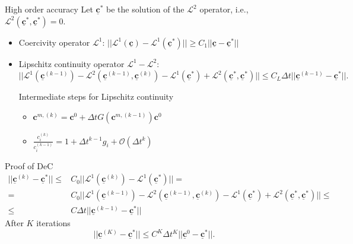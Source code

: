 \documentclass[9pt,compress,t,aspectratio=169]{beamer}
\newcommand{\Ol}{\mathcal{O}}
\newcommand{\1}{\begin{pmatrix}
                 1\\
                 1
                \end{pmatrix}}
\def\L{\mathcal{L}}
\def\bbc{\underline{\mathbf{c}}}
\def\bc{\mathbf{c}}
\begin{document}
\begin{frame}{High order accuracy}
Let $\bbc^*$ be the solution of the $\L^2$ operator, i.e., $\L^2(\bbc^*,\bbc^*)=0$.
\begin{itemize}
\item Coercivity operator $\L^1$: $||\L^1(\bbc)-\L^1(\bbc^*) ||\geq C_1||\bbc -\bbc^*||$ 
\item Lipschitz continuity operator $\L^1 - \L^2$:\\
$||\L^1 (\bbc^{(k-1)}) -\L^2 (\bbc^{(k-1)}, \bbc^{(k)}) -\L^1 ( \bbc^*) +\L^2 (\bbc^*,\bbc^*)||\leq C_L \Delta t ||\bbc^{(k-1)} -\bbc^*|| .$

\vspace{5mm}
Intermediate steps for Lipschitz continuity
\begin{itemize}
\item $
\bc^{m,(k)}=\bc^0 + \Delta t G(\bc^{m,(k-1)}) \bc^0
$
\item  $
  \frac{c_i^{(k)}}{c_i^{(k-1)}} =1+\Delta t^{k-1}g_i +\Ol(\Delta t^k)
 $
\end{itemize}

\end{itemize}

\end{frame}

\begin{frame}{Proof of DeC}
\begin{align}
||\bbc^{(k)}-\bbc^*||\leq & C_0|| \L^1(\bbc^{(k)}) - \L^1(\bbc^*) ||= \label{eq:coercivity}\\
= & C_0|| \L^1(\bbc^{(k-1)}) -\L^2(\bbc^{(k-1)}, \bbc^{(k)}) - \L^1(\bbc^*) +\L^2(\bbc^*, \bbc^*) ||\leq \label{eq:same_states}\\
\leq & C \Delta t || \bbc^{(k-1)}- \bbc^* || \label{eq:lipschitz}
\end{align}
After $K$ iterations 
\begin{equation}
||\bbc^{(K)}-\bbc^*||\leq C^K \Delta t^K ||\bbc^0 -\bbc^*||.
\end{equation}

\end{frame}
\end{document}
